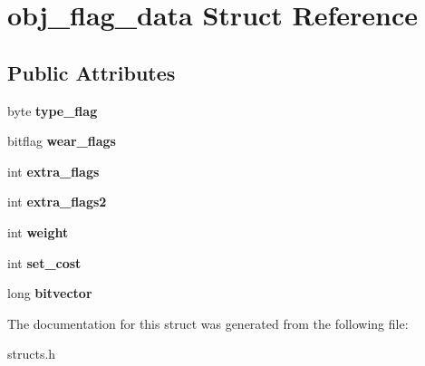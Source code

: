 \hypertarget{structobj__flag__data}{\section{obj\-\_\-flag\-\_\-data Struct Reference}
\label{structobj__flag__data}
}
\subsection*{Public Attributes}
\begin{DoxyCompactItemize}
\item 
\hypertarget{structobj__flag__data_a9a0abc63896f4f00368603321ecb4e60}{byte {\bfseries type\-\_\-flag}}\label{structobj__flag__data_a9a0abc63896f4f00368603321ecb4e60}

\item 
\hypertarget{structobj__flag__data_a23018dd0bbb80c771ca335cba31d968c}{bitflag {\bfseries wear\-\_\-flags}}\label{structobj__flag__data_a23018dd0bbb80c771ca335cba31d968c}

\item 
\hypertarget{structobj__flag__data_a68873d06d59dc879eb51d8e735963b9f}{int {\bfseries extra\-\_\-flags}}\label{structobj__flag__data_a68873d06d59dc879eb51d8e735963b9f}

\item 
\hypertarget{structobj__flag__data_a0bd18c08b6c3b1371634959e77e2f845}{int {\bfseries extra\-\_\-flags2}}\label{structobj__flag__data_a0bd18c08b6c3b1371634959e77e2f845}

\item 
\hypertarget{structobj__flag__data_a066008057439b4c23919acea5c646741}{int {\bfseries weight}}\label{structobj__flag__data_a066008057439b4c23919acea5c646741}

\item 
\hypertarget{structobj__flag__data_a094eee4c675f5a6b1959fd1f3ea48613}{int {\bfseries set\-\_\-cost}}\label{structobj__flag__data_a094eee4c675f5a6b1959fd1f3ea48613}

\item 
\hypertarget{structobj__flag__data_a9fc43403ff7a9e0ab701937e64e42263}{long {\bfseries bitvector}}\label{structobj__flag__data_a9fc43403ff7a9e0ab701937e64e42263}

\end{DoxyCompactItemize}


The documentation for this struct was generated from the following file\-:\begin{DoxyCompactItemize}
\item 
structs.\-h\end{DoxyCompactItemize}
